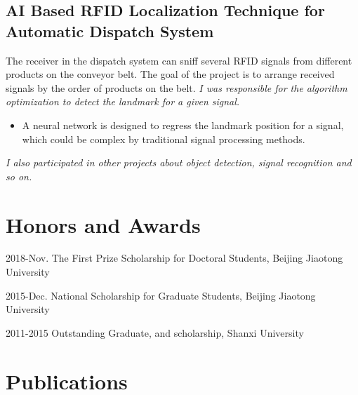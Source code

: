 \documentclass[12pt,letterpaper]{report}
\newcommand{\listitemspace}{0.15em}%
\newenvironment{desp}
{\begin{list}{}{\setlength{\leftmargin}{0em}
			\setlength{\parskip}{0em}
			\setlength{\itemsep}{\listitemspace}
			\setlength{\parsep}{\listitemspace}}}
	{\end{list}}
\begin{document}
	\subsection*{AI Based RFID Localization Technique for Automatic Dispatch System}

	\begin{desp}

		\item The receiver in the dispatch system can sniff several RFID signals from different products on the conveyor belt. The goal of the project is to arrange received signals by the order of products on the belt. \textit{I was responsible for the algorithm optimization to detect the landmark for a given signal.}
		\begin{itemize}
			\item A neural network is designed to regress the landmark position for a signal, which could be complex by traditional signal processing methods.
	  \end{itemize}
	\end{desp}

	\begin{desp}

		\item \emph{I also participated in other projects about object detection, signal recognition and so on.}

	\end{desp}

  \section*{Honors and Awards}

  \begin{tablist}

		\item[2018-Nov.] \tab The First Prize Scholarship for Doctoral Students, Beijing Jiaotong University

		\item[2015-Dec.] \tab National Scholarship for Graduate Students, Beijing Jiaotong University

		\item[2011-2015] \tab Outstanding Graduate, and scholarship, Shanxi University

  \end{tablist}



	\section*{Publications}
\end{document}
